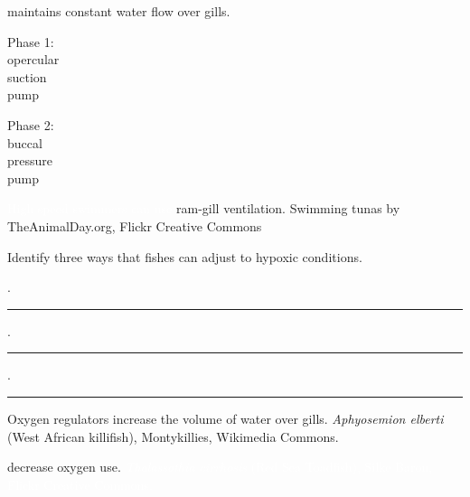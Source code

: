 \documentclass[t,handout]{beamer}  %
\begin{document}
{
\begin{frame}[t,plain]{ maintains constant water flow over gills.}

\hangpara\hspace{1.5em}\parbox{2cm}{Phase 1:\\opercular\\ suction\\ pump}
\pause\hspace{8.2em}\parbox{2cm}{Phase 2:\\buccal\\ pressure\\ pump}

\end{frame}
}

{
\begin{frame}[b,plain]{\textcolor{white}{High speed swimmers can use} \textcolor{orange7}{ram-gill ventilation.}}
\tiny\textcolor{white!20!black}{Swimming tunas by TheAnimalDay.org, Flickr Creative Commons}
\end{frame}
}

\begin{frame}[c,plain]{Identify three ways that fishes can adjust to hypoxic conditions.}

	. \rule{6cm}{0.4pt}

	\vspace{2\baselineskip}

	. \rule{6cm}{0.4pt}

	\vspace{2\baselineskip}

	. \rule{6cm}{0.4pt}

	\vspace{2\baselineskip}

\end{frame}

{
\begin{frame}[b,plain]{\textcolor{orange7}{Oxygen regulators} increase the volume of water over gills.}
\hfill\tiny\textcolor{white!70!black}{\textit{Aphyosemion elberti} (West African killifish), Montykillies, Wikimedia Commons.}
\end{frame}
}

{
\begin{frame}[b,plain]{ decrease oxygen use.}
\hfill\tiny\textcolor{white}{\textit{Thalassothia cirrhosis} (Red Sea Toadfish), Silke Baron, Flickr Creative Commons.}
\end{frame}
}
\end{document}
